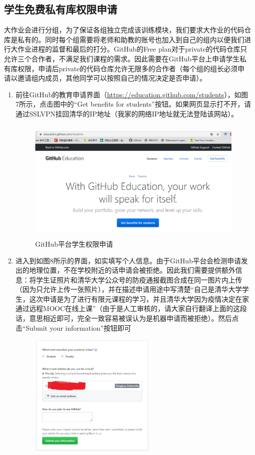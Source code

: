 \documentclass[a4paper,14pt]{article}
\begin{document}
\quad

\quad

\subsection*{学生免费私有库权限申请}
大作业会进行分组，为了保证各组独立完成该训练模块，我们要求大作业的代码仓库是私有的。同时每个组需要将老师和助教的账号也加入到自己的组内以便我们进行大作业进程的监督和最后的打分。GitHub的Free plan对于private的代码仓库只允许三个合作者，不满足我们课程的需求。因此需要在GitHub平台上申请学生私有库权限，申请后private的代码仓库允许无限多的合作者（每个组的组长必须申请以邀请组内成员，其他同学可以按照自己的情况决定是否申请）。
\begin{enumerate}[1. ]
\item 前往GitHub的教育申请界面（\url{https://education.github.com/students}），如图7所示，点击图中的“Get benefits for students”按钮。如果网页显示打不开，请通过SSLVPN挂回清华的IP地址（我家的网络IP地址就无法登陆该网站）。
\begin{figure}[h]
\centering
\includegraphics[height=6cm]{figure/GitHub_Edu}
\caption{GitHub平台学生权限申请}
\end{figure}
\item 进入到如图8所示的界面，如实填写个人信息。由于GitHub平台会检测申请发出的地理位置，不在学校附近的话申请会被拒绝。因此我们需要提供额外信息：将学生证照片和清华大学公众号的防疫通报截图合成在同一图片内上传（因为只允许上传一张照片），并在描述申请用途中写清楚“自己是清华大学学生，这次申请是为了进行有限元课程的学习，并且清华大学因为疫情决定在家通过远程MOOC在线上课”（由于是人工审核的，请大家自行翻译上面的这段话，意思相近即可，完全一致容易被误认为是机器申请而被拒绝）。然后点击“Submit your information”按钮即可
\begin{figure}[h]
\centering
\includegraphics[height=6cm]{figure/GitHub_Edu_Apply}

\end{figure}
\end{enumerate}
\end{document}
